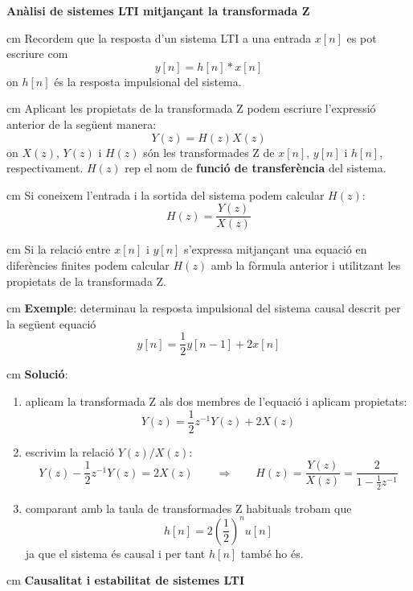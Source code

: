\documentclass{article}
\begin{document}
\newpage
\noindent
\textbf{An\`alisi de sistemes LTI mitjan\c{c}ant la transformada Z}

 cm
\noindent
Recordem que la resposta d'un sistema LTI a una entrada $x[n]$ es pot escriure com
\[
y[n]=h[n] * x[n]
\]
\noindent
on $h[n]$ \'es la resposta impulsional del sistema.

 cm
\noindent
Aplicant les propietats de la transformada Z podem escriure l'expressi\'o anterior
de la seg\"uent manera:
\[
Y(z)=H(z) X(z)
\]
\noindent
on $X(z)$, $Y(z)$ i $H(z)$ s\'on les transformades Z de $x[n]$, $y[n]$ i $h[n]$, respectivament.
$H(z)$ rep el nom de \textbf{funci\'o de transfer\`encia} del sistema.

 cm
\noindent
Si coneixem l'entrada i la sortida del sistema podem calcular $H(z)$:
\[
H(z)=\frac{Y(z)}{X(z)}
\]

 cm
\noindent
Si la relaci\'o entre $x[n]$ i $y[n]$ s'expressa mitjan\c{c}ant una equaci\'o en difer\`encies
finites podem calcular $H(z)$ amb la f\`ormula anterior i utilitzant les propietats de la transformada Z.

 cm
\noindent
\textbf{Exemple}: determinau la resposta impulsional del sistema causal descrit per la seg\"uent equaci\'o
\[
y[n]=\frac{1}{2}y[n-1]+2x[n]
\]

 cm
\noindent
\textbf{Soluci\'o}: 
\begin{enumerate}
\item aplicam la transformada Z als dos membres de l'equaci\'o i aplicam propietats:
\[
Y(z)=\frac{1}{2}z^{-1}Y(z)+2X(z)
\]
\item escrivim la relaci\'o $Y(z)/X(z)$:
\[
Y(z)-\frac{1}{2}z^{-1}Y(z)=2X(z) \qquad \Longrightarrow \qquad H(z)=\frac{Y(z)}{X(z)}=\frac{2}{1-\frac{1}{2}z^{-1}}
\]
\item comparant amb la taula de transformades Z habituals trobam que 
\[
h[n]=2(\frac{1}{2})^n u[n]
\]
\noindent
ja que el sistema \'es causal i per tant $h[n]$ tamb\'e ho \'es.
\end{enumerate}


 cm
\noindent
\textbf{Causalitat i estabilitat de sistemes LTI}
\end{document}
